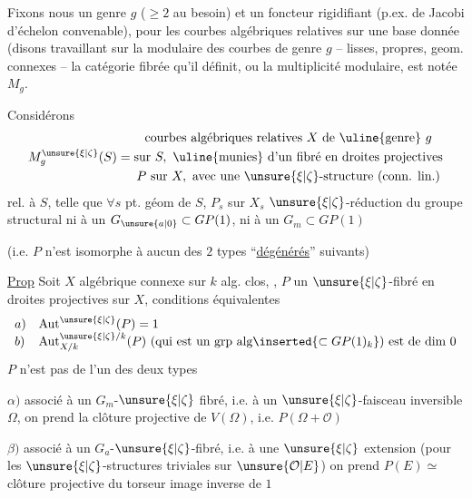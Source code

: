 Fixons nous un genre $g$ ($\ge2$ au besoin) et un foncteur rigidifiant (p.ex. de Jacobi d'échelon convenable), pour les courbes algébriques relatives sur une base donnée (disons travaillant sur la  modulaire des courbes de genre $g$ -- lisses, propres, geom. connexes -- la catégorie fibrée qu'il définit, ou la multiplicité modulaire, est notée $M_g$.

Considérons
\[
M_g^{\unsure{\xi|\zeta}}(S)=\begin{gathered}
\text{courbes algébriques relatives }X\text{ de \uline{genre} }g\\
\text{sur }S,\ \text{\uline{munies} d'un fibré en droites projectives}\\
P\text{ sur }X,\text{ avec une }\unsure{\xi|\zeta}\text{-structure (conn. lin.)}
\end{gathered}
\]
rel. à $S$, telle que $\forall s$ pt. géom de $S$,  $P_s$ sur $X_s$  $\unsure{\xi|\zeta}$-réduction du groupe structural ni à un $G_{\unsure{a|0}}\subset GP(1)$, ni à un $G_m\subset GP(1)$

(i.e. $P$ n'est isomorphe à aucun des $2$ types ``\uline{dégénérés}'' suivants\unsure{\ldots\ldots})

\uline{Prop} Soit $X$  algébrique connexe sur $k$ alg. clos, , $P$ un $\unsure{\xi|\zeta}$-fibré en droites projectives sur $X$, conditions équivalentes
\[
\begin{array}{ll}
a)&\operatorname{Aut}^{\unsure{\xi|\zeta}}(P)=1\\
b)&\operatorname{Aut}^{\unsure{\xi|\zeta}/k}_{X/k}(P)\text{ (qui est un grp alg}\inserted{\subset GP(1)_k}\text{) est de dim }0
\end{array}
\]
 $P$ n'est pas de l'un des deux types

$\alpha)$ associé à un $G_m$-$\unsure{\xi|\zeta}$ fibré, i.e. à un $\unsure{\xi|\zeta}$-faisceau inversible $\Omega$, on prend la clôture projective de $V(\Omega)$, i.e. $P(\Omega+\mathcal O)$

$\beta)$ associé à un $G_a$-$\unsure{\xi|\zeta}$-fibré, i.e. à une $\unsure{\xi|\zeta}$ extension
(pour les $\unsure{\xi|\zeta}$-structures triviales sur $\unsure{\mathcal O|E}$) on prend $P(E)\simeq$ clôture projective du torseur image inverse de $1$
